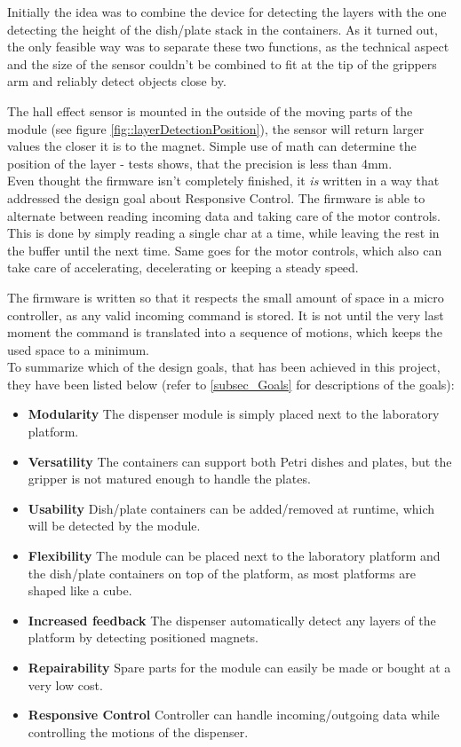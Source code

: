 \documentclass[10pt,a4paper]{article}
\begin{document}
		Initially the idea was to combine the device for detecting the layers with the one detecting the height of the dish/plate stack in the containers. As it turned out, the only feasible way was to separate these two functions, as the technical aspect and the size of the sensor couldn't be combined to fit at the tip of the grippers arm and reliably detect objects close by. 
		
		The hall effect sensor is mounted in the outside of the moving parts of the module (see figure \ref{fig::layerDetectionPosition}), the sensor will return larger values the closer it is to the magnet. Simple use of math can determine the position of the layer - tests shows, that the precision is less than 4mm.\\
		
		Even thought the firmware isn't completely finished, it \textit{is} written in a way that addressed the design goal about Responsive Control. The firmware is able to alternate between reading incoming data and taking care of the motor controls. This is done by simply reading a single char at a time, while leaving the rest in the buffer until the next time. Same goes for the motor controls, which also can take care of accelerating, decelerating or keeping a steady speed.
		
		The firmware is written so that it respects the small amount of space in a micro controller, as any valid incoming command is stored. It is not until the very last moment the command is translated into a sequence of motions, which keeps the used space to a minimum.\\
		
	\newpage
		To summarize which of the design goals, that has been achieved in this project, they have been listed below (refer to \ref{subsec_Goals} for descriptions of the goals):
		\begin{itemize}
			\item \textbf{Modularity} The dispenser module is simply placed next to the laboratory platform.
			\item \textbf{Versatility} The containers can support both Petri dishes and plates, but the gripper is not matured enough to handle the plates.
			\item \textbf{Usability} Dish/plate containers can be added/removed at runtime, which will be detected by the module.
			\item \textbf{Flexibility} The module can be placed next to the laboratory platform and the dish/plate containers on top of the platform, as most platforms are shaped like a cube.
			\item \textbf{Increased feedback} The dispenser automatically detect any layers of the platform by detecting positioned magnets.
			\item \textbf{Repairability} Spare parts for the module can easily be made or bought at a very low cost.
			\item \textbf{Responsive Control} Controller can handle incoming/outgoing data while controlling the motions of the dispenser.
		\end{itemize}
	
\end{document}
